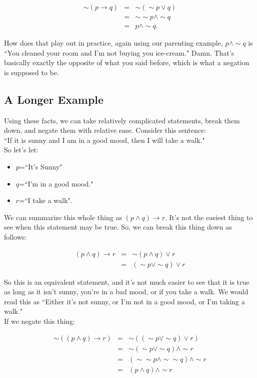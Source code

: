 \begin{eqnarray*}
\sim(p\to q)&=&\sim(\sim p \vee q)\\
&=&\sim\sim p\wedge \sim q\\
&=&p\wedge \sim q.
\end{eqnarray*}

How does that play out in practice, again using our parenting example, $p\wedge \sim q$ is ``You cleaned your room and I'm not buying you ice-cream."  Damn.  That's basically exactly the opposite of what you said before, which is what a negation is supposed to be.  

\subsection{A Longer Example}

Using these facts, we can take relatively complicated statements, break them down, and negate them with relative ease.  Consider this sentence:\\

``If it is sunny and I am in a good mood, then I will take a walk."\\

So let's let:

\begin{itemize}
\item $p$=``It's Sunny"
\item $q$=``I'm in a good mood."
\item $r$=``I take a walk".
\end{itemize}

We can summarize this whole thing as $(p\wedge q)\to r$.  It's not the easiest thing to see when this statement may be true.  So, we can break this thing down as follows:

\begin{eqnarray*}
(p\wedge q)\to r&=&\sim (p\wedge q)\vee r\\
&=&(\sim p \vee \sim q) \vee r
\end{eqnarray*}

So this is an equivalent statement, and it's not much easier to see that it is true as long as it isn't sunny, you're in a bad mood, or if you take a walk. We would read this as ``Either it's not sunny, or I'm not in a good mood, or I'm taking a walk." \\ 

 If we negate this thing:



\begin{eqnarray*}
\sim ((p\wedge q)\to r)&=&\sim ((\sim p \vee \sim q) \vee r)\\
&=&\sim (\sim p \vee \sim q) \wedge \sim r\\
&=& (\sim \sim p  \wedge \sim \sim q) \wedge \sim r\\
&=&(p\wedge q)\wedge \sim r
\end{eqnarray*}

